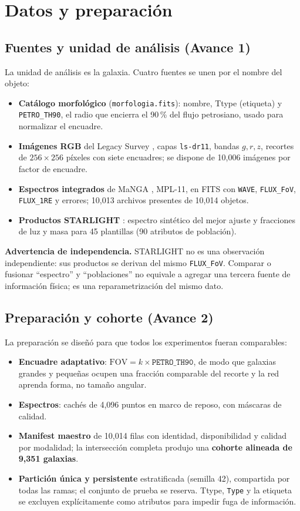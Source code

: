 \section{Datos y preparación}
\label{sec:datos}

\subsection{Fuentes y unidad de análisis (Avance 1)}
La unidad de análisis es la galaxia. Cuatro fuentes se unen por el nombre del objeto:
\begin{itemize}
  \item \textbf{Catálogo morfológico} (\texttt{morfologia.fits}): nombre, Ttype (etiqueta) y \texttt{PETRO\_TH90}, el radio que encierra el 90\,\% del flujo petrosiano, usado para normalizar el encuadre.
  \item \textbf{Imágenes RGB} del Legacy Survey \citep{dey2019}, capas \texttt{ls-dr11}, bandas $g,r,z$, recortes de $256\times256$ píxeles con siete encuadres; se dispone de 10,006 imágenes por factor de encuadre.
  \item \textbf{Espectros integrados} de MaNGA \citep{bundy2015}, MPL-11, en FITS con \texttt{WAVE}, \texttt{FLUX\_FoV}, \texttt{FLUX\_1RE} y errores; 10,013 archivos presentes de 10,014 objetos.
  \item \textbf{Productos STARLIGHT} \citep{cidfernandes2005}: espectro sintético del mejor ajuste y fracciones de luz y masa para 45 plantillas (90 atributos de población).
\end{itemize}
\textbf{Advertencia de independencia.} STARLIGHT no es una observación independiente: sus productos se derivan del mismo \texttt{FLUX\_FoV}. Comparar o fusionar ``espectro'' y ``poblaciones'' no equivale a agregar una tercera fuente de información física; es una reparametrización del mismo dato.

\subsection{Preparación y cohorte (Avance 2)}
La preparación se diseñó para que todos los experimentos fueran comparables:
\begin{itemize}
  \item \textbf{Encuadre adaptativo}: $\text{FOV} = k \times \texttt{PETRO\_TH90}$, de modo que galaxias grandes y pequeñas ocupen una fracción comparable del recorte y la red aprenda forma, no tamaño angular.
  \item \textbf{Espectros}: cachés de 4,096 puntos en marco de reposo, con máscaras de calidad.
  \item \textbf{Manifest maestro} de 10,014 filas con identidad, disponibilidad y calidad por modalidad; la intersección completa produjo una \textbf{cohorte alineada de 9,351 galaxias}.
  \item \textbf{Partición única y persistente} estratificada (semilla 42), compartida por todas las ramas; el conjunto de prueba se reserva. Ttype, \texttt{Type} y la etiqueta se excluyen explícitamente como atributos para impedir fuga de información.
\end{itemize}

